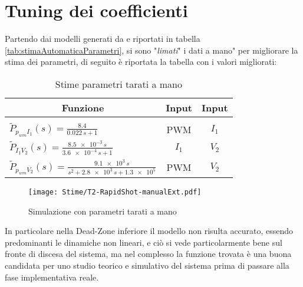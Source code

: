 \section{Tuning dei coefficienti}
Partendo dai modelli generati da \cite*{IdentificationToolbox} e riportati in tabella \ref{tab:stimaAutomaticaParametri}, si sono "\textit{limati}" i dati a mano" per migliorare la stima dei parametri, di seguito è riportata la tabella con i valori migliorati:
\begin{table}[H]
	\centering
	\caption[Stime parametri tarati a mano]{Stime parametri tarati a mano}		\label{tab:stimaManualeParametri}
	\vspace{1mm}
	\begin{tabular}[t]{||l|c|c||}
		\hline
		\multicolumn{1}{||c}{\textbf{Funzione}}                                                & \multicolumn{1}{|c}{\textbf{Input}} & \multicolumn{1}{|c||}{\textbf{Input}} \\
		\hline\hline
		                                                                                       &                                     &                                       \\[-3mm]
		$\tilde{P}_{p_{wm} I_1}(s) = \frac{8.4}{0.022\,s+1}$                                   & PWM                                 & $I_1$                                 \\[3mm]

		$\tilde{P}_{I_1 V_2}(s) = \frac{\num{8.5e-3}\,s}{\num{3.6e-4}\,s+1}$                   & $I_1$                               & $V_2$                                 \\[3mm]

		$\tilde{P}_{p_{wm} V_2}(s) = \frac{\num{9.1e+3}\,s}{s^2+\num{2.8e+3}\,s+\num{1.3e+5}}$ & PWM                                 & $ V_2 $                               \\
		\hline
	\end{tabular}
\end{table}

\begin{figure}[H]
	\centering
	\caption[Simulazione con parametri tarati a mano]{Simulazione con parametri tarati a mano}
	\texttt{[image: Stime/T2-RapidShot-manualExt.pdf]}
\end{figure}
\noindent
In particolare nella Dead-Zone inferiore il modello non risulta accurato, essendo predominanti le dinamiche non lineari, e ciò si vede particolarmente bene sul fronte di discesa del sistema, ma nel complesso la funzione trovata è una buona candidata per uno studio teorico e simulativo del sistema prima di passare alla fase implementativa reale.

